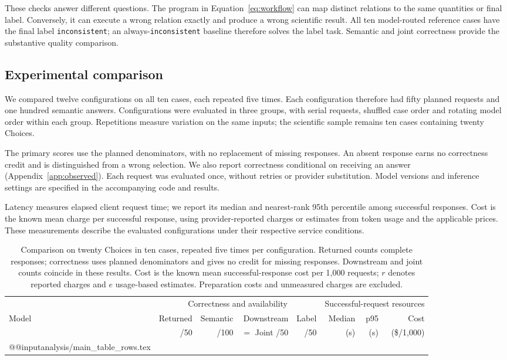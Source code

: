 \documentclass[11pt]{article}
\begin{document}
These checks answer different questions. The program in Equation~\ref{eq:workflow} can map distinct relations to the same quantities or final label. Conversely, it can execute a wrong relation exactly and produce a wrong scientific result. All ten model-routed reference cases have the final label \texttt{inconsistent}; an always-\texttt{inconsistent} baseline therefore solves the label task. Semantic and joint correctness provide the substantive quality comparison.

\subsection{Experimental comparison}
\label{sec:setup}

We compared twelve configurations on all ten cases, each repeated five times. Each configuration therefore had fifty planned requests and one hundred semantic answers. Configurations were evaluated in three groups, with serial requests, shuffled case order and rotating model order within each group. Repetitions measure variation on the same inputs; the scientific sample remains ten cases containing twenty Choices.

The primary scores use the planned denominators, with no replacement of missing responses. An absent response earns no correctness credit and is distinguished from a wrong selection. We also report correctness conditional on receiving an answer (Appendix~\ref{app:observed}). Each request was evaluated once, without retries or provider substitution. Model versions and inference settings are specified in the accompanying code and results.

Latency measures elapsed client request time; we report its median and nearest-rank 95th percentile among successful responses. Cost is the known mean charge per successful response, using provider-reported charges or estimates from token usage and the applicable prices. These measurements describe the evaluated configurations under their respective service conditions.

\begin{table}[t]
\centering
\small
\begin{tabular*}{\textwidth}{@{\extracolsep{\fill}}lrrrrrrr@{}}
\toprule
 & \multicolumn{4}{c}{Correctness and availability} & \multicolumn{3}{c}{Successful-request resources} \\
\cmidrule(lr){2-5}\cmidrule(l){6-8}
Model & Returned & Semantic & Downstream & Label & Median & p95 & Cost \\
 & /50 & /100 & $=$ Joint /50 & /50 & (s) & (s) & (\$/1,000) \\
\midrule
\csname @@input\endcsname analysis/main_table_rows.tex
\bottomrule
\end{tabular*}
\caption{Comparison on twenty Choices in ten cases, repeated five times per configuration. Returned counts complete responses; correctness uses planned denominators and gives no credit for missing responses. Downstream and joint counts coincide in these results. Cost is the known mean successful-response cost per 1,000 requests; $r$ denotes reported charges and $e$ usage-based estimates. Preparation costs and unmeasured charges are excluded.}
\label{tab:main}
\end{table}
\end{document}
